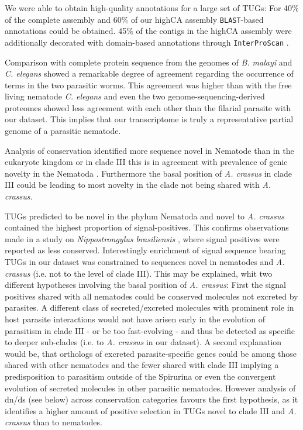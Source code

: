 We were able to obtain high-quality annotations for a large set of
TUGs: For 40\% of the complete assembly and 60\% of our highCA
assembly \texttt{BLAST}-based annotations could be obtained. 45\% of
the contigs in the highCA assembly were additionally decorated with
domain-based annotations through \texttt{InterProScan}
\cite{pmid11590104}.

Comparison with complete protein sequence from the genomes of
\textit{B. malayi} and \textit{C. elegans} showed a remarkable degree
of agreement regarding the occurrence of terms in the two parasitic
worms. This agreement was higher than with the free living nematode
\textit{C. elegans} and even the two genome-sequencing-derived
proteomes showed less agreement with each other than the filarial
parasite with our dataset. This implies that our transcriptome is
truly a representative partial genome
\cite{parkinson_partigene--constructing_2004} of a parasitic nematode.

Analysis of conservation identified more sequence novel in Nematode
than in the eukaryote kingdom or in clade III this is in agreement
with prevalence of genic novelty in the Nematoda
\cite{wasmuth_extent_2008}. Furthermore the basal position of
\textit{A. crassus} in clade III could be leading to most novelty in
the clade not being shared with \textit{A. crassus}.

TUGs predicted to be novel in the phylum Nematoda and novel to
\textit{A. crassus} contained the highest proportion of
signal-positives. This confirms observations made in a study on
\textit{Nippostrongylus brasiliensis} \cite{harcus_signal_2004}, where
signal positives were reported as less conserved. Interestingly
enrichment of signal sequence bearing TUGs in our dataset was
constrained to sequences novel in nematodes and \textit{A. crassus}
(i.e. not to the level of clade III). This may be explained, whit two
different hypotheses involving the basal position of
\textit{A. crassus}: First the signal positives shared with all
nematodes could be conserved molecules not excreted by parasites. A
different class of secreted/excreted molecules with prominent role in
host parasite interactions would not have arisen early in the
evolution of parasitism in clade III - or be too fast-evolving - and
thus be detected as specific to deeper sub-clades (i.e. to
\textit{A. crassus} in our dataset). A second explanation would be,
that orthologs of excreted parasite-specific genes could be among
those shared with other nematodes and the fewer shared with clade III
implying a predisposition to parasitism outside of the Spirurina or
even the convergent evolution of secreted molecules in other parasitic
nematodes. However analysis of dn/ds (see below) across conservation
categories favours the first hypothesis, as it identifies a higher
amount of positive selection in TUGs novel to clade III and
\textit{A. crassus} than to nematodes.


